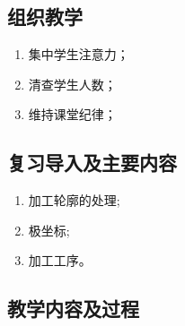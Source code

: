 \jxhj{%
	}

\makeshouye %

\subsection{组织教学}
\begin{enumerate}[\hspace{2em}1、]
	\item 集中学生注意力；
	\item 清查学生人数；
	\item 维持课堂纪律；
\end{enumerate}
\subsection{复习导入及主要内容}
\begin{enumerate}[1、]
	\item 加工轮廓的处理;
	\item 极坐标;
	\item 加工工序。
\end{enumerate}


\subsection{教学内容及过程}

